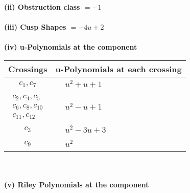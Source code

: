 \documentclass[1p]{elsarticle_modified}
\theoremstyle{definition}
\begin{document}
\flushleft \textbf{(ii) Obstruction class $= -1$}\\~\\
\flushleft \textbf{(iii) Cusp Shapes $= -4 u+2$}\\~\\
\newpage\renewcommand{\arraystretch}{1}
\flushleft \textbf{(iv) u-Polynomials at the component}\newline \\
\begin{tabular}{m{50pt}|m{274pt}}
Crossings & \hspace{64pt}u-Polynomials at each crossing \\
\hline $$\begin{aligned}c_{1},c_{7}\end{aligned}$$&$\begin{aligned}
&u^2+u+1
\end{aligned}$\\
\hline $$\begin{aligned}c_{2},c_{4},c_{5}\\c_{6},c_{8},c_{10}\\c_{11},c_{12}\end{aligned}$$&$\begin{aligned}
&u^2- u+1
\end{aligned}$\\
\hline $$\begin{aligned}c_{3}\end{aligned}$$&$\begin{aligned}
&u^2-3 u+3
\end{aligned}$\\
\hline $$\begin{aligned}c_{9}\end{aligned}$$&$\begin{aligned}
&u^2
\end{aligned}$\\
\hline
\end{tabular}\\~\\
\newpage\renewcommand{\arraystretch}{1}
\flushleft \textbf{(v) Riley Polynomials at the component}\newline \\
\end{document}
